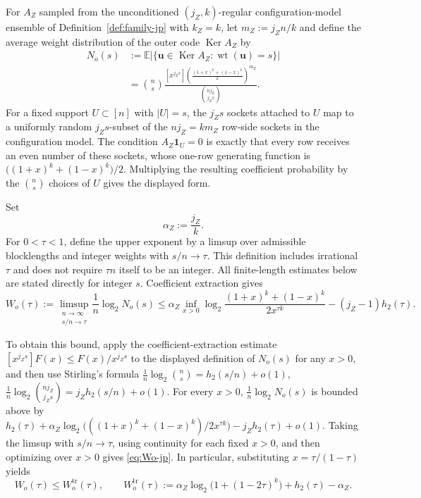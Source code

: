 \documentclass[11pt]{article}
\theoremstyle{definition}
\newcommand{\EE}{\mathbb E}
\newcommand{\wt}{\operatorname{wt}}
\newcommand{\Ker}{\operatorname{Ker}}
\newcommand{\bu}{\mathbf u}
\newcommand{\ones}{\mathbf 1}
\newcommand{\h}{h_2}
\begin{document}
For \(A_Z\) sampled from the unconditioned \((j_Z,k)\)-regular configuration-model ensemble of Definition~\ref{def:family-jp} with \(k_Z=k\), let \(m_Z:=j_Zn/k\) and define the average weight distribution of the outer code \(\Ker A_Z\) by
\begin{equation*}
\begin{split}
N_o(s)
&:=\EE\bigl|\{\bu\in\Ker A_Z:\wt(\bu)=s\}\bigr| \\
&=
\binom{n}{s}
\frac{\left[x^{j_Z s}\right]\left(\frac{(1+x)^k+(1-x)^k}{2}\right)^{m_Z}}
{\binom{n j_Z}{j_Z s}}.
\end{split}
\end{equation*}
For a fixed support \(U\subset[n]\) with \(|U|=s\), the \(j_Zs\) sockets attached to \(U\) map to a uniformly random \(j_Zs\)-subset of the \(n j_Z=km_Z\) row-side sockets in the configuration model.
The condition \(A_Z\ones_U=0\) is exactly that every row receives an even number of these sockets, whose one-row generating function is \(\bigl((1+x)^k+(1-x)^k\bigr)/2\).
Multiplying the resulting coefficient probability by the \(\binom ns\) choices of \(U\) gives the displayed form.

Set
\begin{equation*}
\alpha_Z:=\frac{j_Z}{k}.
\end{equation*}
For \(0<\tau<1\), define the upper exponent by a limsup over
admissible blocklengths and integer weights with \(s/n\to\tau\).
This definition includes irrational \(\tau\) and does not require
\(\tau n\) itself to be an integer. All finite-length estimates below
are stated directly for integer \(s\). Coefficient extraction gives
\begin{equation}\label{eq:Wo-jp}
W_o(\tau):=
\limsup_{\substack{n\to\infty\\s/n\to\tau}}\frac1n\log_2 N_o(s)
\le
\alpha_Z \inf_{x>0}\log_2 \frac{(1+x)^k+(1-x)^k}{2x^{\tau k}} - (j_Z-1)\h(\tau).
\end{equation}

To obtain this bound, apply the coefficient-extraction estimate
\([x^{j_Z s}]F(x)\le F(x)/x^{j_Z s}\) to the displayed definition of \(N_o(s)\) for any \(x>0\),
and then use Stirling's formula
\(\frac1n\log_2\binom{n}{s}=\h(s/n)+o(1)\),
\(\frac1n\log_2\binom{n j_Z}{j_Zs}=j_Z\h(s/n)+o(1)\).
For every \(x>0\),
\(\frac1n\log_2 N_o(s)\) is bounded above by
\(\h(\tau)+\alpha_Z\log_2\!\bigl(((1+x)^k+(1-x)^k)/2x^{\tau k}\bigr)-j_Z\h(\tau)+o(1)\).
Taking the limsup with \(s/n\to\tau\), using continuity for each fixed \(x>0\), and then optimizing over \(x>0\) gives \eqref{eq:Wo-jp}.
In particular, substituting \(x=\tau/(1-\tau)\) yields
\begin{equation}\label{eq:Wo-trial-jp}
W_o(\tau)\le W_o^{\mathrm{tr}}(\tau),
\qquad
W_o^{\mathrm{tr}}(\tau):=
\alpha_Z\log_2\!\bigl(1+(1-2\tau)^k\bigr)+\h(\tau)-\alpha_Z.
\end{equation}
\end{document}
